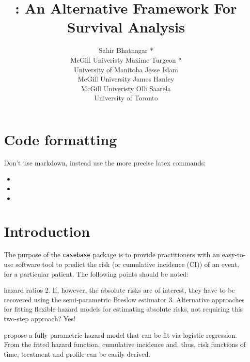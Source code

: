 \documentclass[
]{jss}
\author{
Sahir Bhatnagar *\\McGill Univeristy \And Maxime Turgeon *\\University of Manitoba \And Jesse Islam\\McGill University \And James Hanley\\McGill Univeristy \And Olli Saarela\\University of Toronto
}
\title{\pkg{casebase}: An Alternative Framework For Survival Analysis}
\begin{document}
\hypertarget{code-formatting}{%
\section{Code formatting}\label{code-formatting}}

Don't use markdown, instead use the more precise latex commands:

\begin{itemize}
\item
\item
\item
\end{itemize}

\hypertarget{introduction}{%
\section{Introduction}\label{introduction}}

The purpose of the \texttt{casebase} package is to provide practitioners
with an easy-to-use software tool to predict the risk (or cumulative
incidence (CI)) of an event, for a particular patient. The following
points should be noted:

hazard ratios 2. If, however, the absolute risks are of interest, they
have to be recovered using the semi-parametric Breslow estimator 3.
Alternative approaches for fitting flexible hazard models for estimating
absolute risks, not requiring this two-step approach? Yes!
\citep{hanley2009fitting}

\citep{hanley2009fitting} propose a fully parametric hazard model that
can be fit via logistic regression. From the fitted hazard function,
cumulative incidence and, thus, risk functions of time, treatment and
profile can be easily derived.
\end{document}
